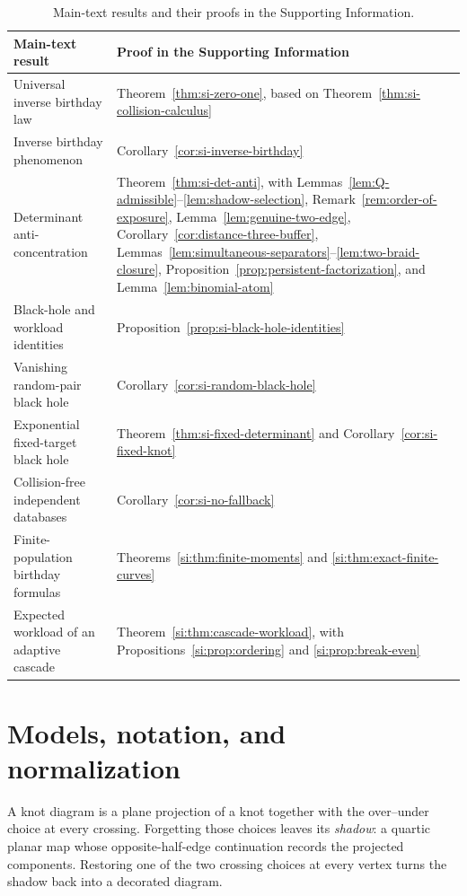 \documentclass[9pt,twoside]{pnas-new}
\theoremstyle{definition}
\theoremstyle{remark}
\begin{document}
\begin{table}[ht]
\centering
\caption{Main-text results and their proofs in the Supporting Information.}
\label{tab:si-main-proof-map}
\begin{tabularx}{\textwidth}{>{\raggedright\arraybackslash}p{}>{\raggedright\arraybackslash}X}
\toprule
Main-text result & Proof in the Supporting Information \\
\midrule
Universal inverse birthday law & Theorem~\ref{thm:si-zero-one}, based on Theorem~\ref{thm:si-collision-calculus} \\
Inverse birthday phenomenon & Corollary~\ref{cor:si-inverse-birthday} \\
Determinant anti-concentration & Theorem~\ref{thm:si-det-anti}, with Lemmas~\ref{lem:Q-admissible}--\ref{lem:shadow-selection}, Remark~\ref{rem:order-of-exposure}, Lemma~\ref{lem:genuine-two-edge}, Corollary~\ref{cor:distance-three-buffer}, Lemmas~\ref{lem:simultaneous-separators}--\ref{lem:two-braid-closure}, Proposition~\ref{prop:persistent-factorization}, and Lemma~\ref{lem:binomial-atom} \\
Black-hole and workload identities & Proposition~\ref{prop:si-black-hole-identities} \\
Vanishing random-pair black hole & Corollary~\ref{cor:si-random-black-hole} \\
Exponential fixed-target black hole & Theorem~\ref{thm:si-fixed-determinant} and Corollary~\ref{cor:si-fixed-knot} \\
Collision-free independent databases & Corollary~\ref{cor:si-no-fallback} \\
Finite-population birthday formulas & Theorems~\ref{si:thm:finite-moments} and \ref{si:thm:exact-finite-curves} \\
Expected workload of an adaptive cascade & Theorem~\ref{si:thm:cascade-workload}, with Propositions~\ref{si:prop:ordering} and \ref{si:prop:break-even} \\
\bottomrule
\end{tabularx}
\end{table}
\FloatBarrier
\section{Models, notation, and normalization}
\label{sec:si-models}
A knot diagram is a plane projection of a knot together with the over--under choice at every crossing. Forgetting those choices leaves its \emph{shadow}: a quartic planar map whose opposite-half-edge continuation records the projected components. Restoring one of the two crossing choices at every vertex turns the shadow back into a decorated diagram.
\end{document}
